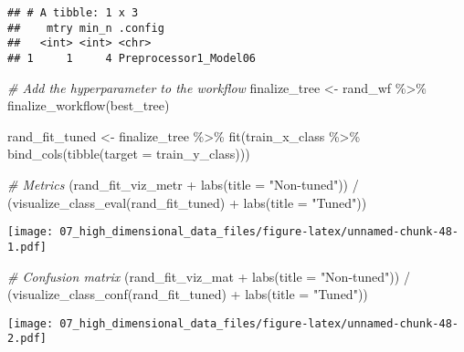 \documentclass[
]{book}
\newenvironment{Shaded}{\begin{snugshade}}{\end{snugshade}}
\newcommand{\AttributeTok}[1]{\textcolor[rgb]{0.77,0.63,0.00}{#1}}
\newcommand{\CommentTok}[1]{\textcolor[rgb]{0.56,0.35,0.01}{\textit{#1}}}
\newcommand{\FunctionTok}[1]{\textcolor[rgb]{0.00,0.00,0.00}{#1}}
\newcommand{\NormalTok}[1]{#1}
\newcommand{\OtherTok}[1]{\textcolor[rgb]{0.56,0.35,0.01}{#1}}
\newcommand{\SpecialCharTok}[1]{\textcolor[rgb]{0.00,0.00,0.00}{#1}}
\newcommand{\StringTok}[1]{\textcolor[rgb]{0.31,0.60,0.02}{#1}}
\begin{document}
\begin{verbatim}
## # A tibble: 1 x 3
##    mtry min_n .config              
##   <int> <int> <chr>                
## 1     1     4 Preprocessor1_Model06
\end{verbatim}

\begin{Shaded}
\begin{Highlighting}[]
\CommentTok{\# Add the hyperparameter to the workflow}
\NormalTok{finalize\_tree }\OtherTok{\textless{}{-}}\NormalTok{ rand\_wf }\SpecialCharTok{\%\textgreater{}\%}
  \FunctionTok{finalize\_workflow}\NormalTok{(best\_tree)}
\end{Highlighting}
\end{Shaded}

\begin{Shaded}
\begin{Highlighting}[]
\NormalTok{rand\_fit\_tuned }\OtherTok{\textless{}{-}}\NormalTok{ finalize\_tree }\SpecialCharTok{\%\textgreater{}\%}
  \FunctionTok{fit}\NormalTok{(train\_x\_class }\SpecialCharTok{\%\textgreater{}\%} \FunctionTok{bind\_cols}\NormalTok{(}\FunctionTok{tibble}\NormalTok{(}\AttributeTok{target =}\NormalTok{ train\_y\_class)))}

\CommentTok{\# Metrics}
\NormalTok{(rand\_fit\_viz\_metr }\SpecialCharTok{+} \FunctionTok{labs}\NormalTok{(}\AttributeTok{title =} \StringTok{"Non{-}tuned"}\NormalTok{)) }\SpecialCharTok{/}\NormalTok{ (}\FunctionTok{visualize\_class\_eval}\NormalTok{(rand\_fit\_tuned) }\SpecialCharTok{+} \FunctionTok{labs}\NormalTok{(}\AttributeTok{title =} \StringTok{"Tuned"}\NormalTok{))}
\end{Highlighting}
\end{Shaded}

\texttt{[image: 07\_high\_dimensional\_data\_files/figure-latex/unnamed-chunk-48-1.pdf]}

\begin{Shaded}
\begin{Highlighting}[]
\CommentTok{\# Confusion matrix}
\NormalTok{(rand\_fit\_viz\_mat }\SpecialCharTok{+} \FunctionTok{labs}\NormalTok{(}\AttributeTok{title =} \StringTok{"Non{-}tuned"}\NormalTok{)) }\SpecialCharTok{/}\NormalTok{ (}\FunctionTok{visualize\_class\_conf}\NormalTok{(rand\_fit\_tuned) }\SpecialCharTok{+} \FunctionTok{labs}\NormalTok{(}\AttributeTok{title =} \StringTok{"Tuned"}\NormalTok{))}
\end{Highlighting}
\end{Shaded}

\texttt{[image: 07\_high\_dimensional\_data\_files/figure-latex/unnamed-chunk-48-2.pdf]}
\end{document}
